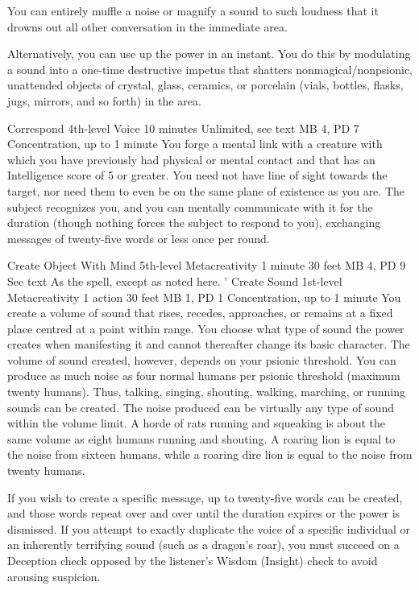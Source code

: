 You can entirely muffle a noise or magnify a sound to such
loudness that it drowns out all other conversation in the
immediate area.

Alternatively, you can use up the power in an instant. You
do this by modulating a sound into a one-time destructive
impetus that shatters nonmagical/nonpsionic, unattended objects
of crystal, glass, ceramics, or porcelain (vials, bottles,
flasks, jugs, mirrors, and so forth) in the area.

\DndPowerHeader%
    {Correspond\label{pwr:correspond}}
    {4th-level Voice}
    {10 minutes}
    {Unlimited, see text}
    {MB 4, PD 7}
    {Concentration, up to 1 minute}
You forge a mental link with a creature with
which you have previously had physical or mental contact and
that has an Intelligence score of 5 or greater. You need not
have line of sight towards the target, nor need them to even
be on the same plane of existence as you are. The subject
recognizes you, and you can mentally communicate with it for
the duration (though nothing forces the subject to respond
to you), exchanging messages of twenty-five words or less
once per round.

\DndPowerHeader%
    {Create Object With Mind\label{pwr:create_object_with_mind}}
    {5th-level Metacreativity}
    {1 minute}
    {30 feet}
    {MB 4, PD 9}
    {See text}
As the  spell, except as
noted here. '
\DndPowerHeader%
    {Create Sound\label{pwr:create_sound}}
    {1st-level Metacreativity}
    {1 action}
    {30 feet}
    {MB 1, PD 1}
    {Concentration, up to 1 minute}
You create a volume of sound that rises,
recedes, approaches, or remains at a fixed place centred at
a point within range. You choose what type of sound the power
creates when manifesting it and cannot thereafter change its
basic character. The volume of sound created, however, depends
on your psionic threshold. You can produce as much noise as
four normal humans per psionic threshold (maximum twenty humans).
Thus, talking, singing, shouting, walking, marching, or running
sounds can be created. The noise produced can be virtually
any type of sound within the volume limit. A horde of rats
running and squeaking is about the same volume as eight humans
running and shouting. A roaring lion is equal to the noise
from sixteen humans, while a roaring dire lion is equal to
the noise from twenty humans.

If you wish to create a specific message, up to twenty-five
words can be created, and those words repeat over and over
until the duration expires or the power is dismissed. If you
attempt to exactly duplicate the voice of a specific individual
or an inherently terrifying sound (such as a dragon's roar),
you must succeed on a Deception check opposed by the listener's
Wisdom (Insight) check to avoid arousing suspicion.

